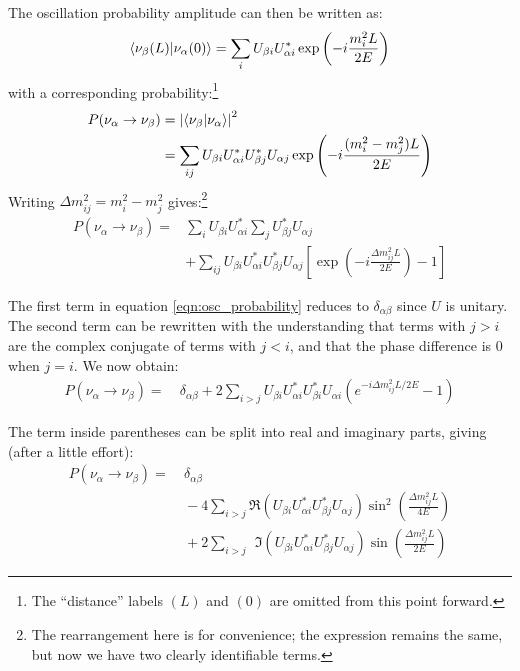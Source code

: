 The oscillation probability amplitude can then be written as:
\begin{equation}\label{eqn:osc_prob_amplitude}
\langle \nu_\beta(L)|\nu_\alpha(0)\rangle = \sum_i U_{\beta i} U_{\alpha i}^* \exp\left(-i \frac{m_i^2 L}{2E}\right)
\end{equation}
with a corresponding probability:\footnote{The ``distance'' labels $(L)$ and $(0)$ are omitted from this point forward.}
\begin{align}\label{eqn:osc_probability}
P(\nu_\alpha \rightarrow \nu_\beta) & = \left|\langle \nu_\beta|\nu_\alpha\rangle\right|^2 \\
 & = \sum_{ij} U_{\beta i} U_{\alpha i}^* U_{\beta j}^* U_{\alpha j} \exp\left(-i\frac{(m_i^2 - m_j^2)L}{2E}\right) \nonumber
\end{align}
Writing $\Delta m_{ij}^2 = m_i^2 - m_j^2$ gives:\footnote{The rearrangement here is for convenience; the expression remains the same, but now we have two clearly identifiable terms.}
\begin{align}
P(\nu_\alpha \rightarrow \nu_\beta) = & \sum_i U_{\beta i} U_{\alpha i}^* \sum_j U_{\beta j}^* U_{\alpha j} \nonumber \\
 & + \sum_{ij} U_{\beta i} U_{\alpha i}^* U_{\beta j}^* U_{\alpha j} \left[ \exp\left(-i\frac{\Delta m_{ij}^2 L}{2E}\right) - 1\right]
 \end{align}

The first term in equation \eqref{eqn:osc_probability} reduces to $\delta_{\alpha\beta}$ since $U$ is unitary. The second term can be rewritten with the understanding that terms with $j > i$ are the complex conjugate of terms with $j < i$, and that the phase difference is $0$ when $j = i$. We now obtain:
\begin{align}\label{eqn:osc_probability_again}
P(\nu_\alpha \rightarrow \nu_\beta) = &~ \delta_{\alpha\beta} + 2\sum_{i > j} U_{\beta i} U_{\alpha i}^* U_{\beta i}^* U_{\alpha i}\left(e^{-i\Delta m_{ij}^2 L / 2E} - 1 \right) 
\end{align}

The term inside parentheses can be split into real and imaginary parts, giving (after a little effort):
\begin{align}\label{eqn:osc_prob_threeparts}
P(\nu_\alpha \rightarrow \nu_\beta) = & ~\delta_{\alpha\beta} \nonumber \\
 &~ - 4\sum_{i> j} \Re \left( U_{\beta i} U_{\alpha i}^* U_{\beta j}^* U_{\alpha j} \right) \sin^2\left(\frac{\Delta m_{ij}^2 L}{4E}\right) \nonumber \\
 &~ + 2\sum_{i> j} \phantom{^2} \Im \left( U_{\beta i} U_{\alpha i}^* U_{\beta j}^* U_{\alpha j}\right) \sin \left(\frac{\Delta m_{ij}^2 L}{2E}\right) 
\end{align}


